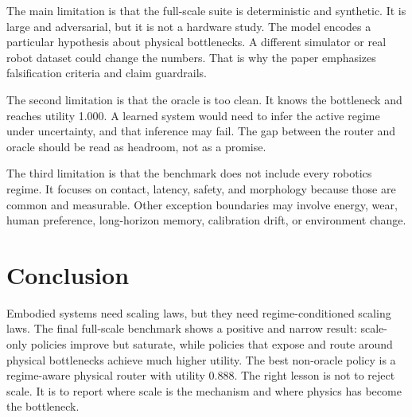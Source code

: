 \documentclass{article}
\begin{document}
The main limitation is that the full-scale suite is deterministic and synthetic. It is large and adversarial, but it is not a hardware study. The model encodes a particular hypothesis about physical bottlenecks. A different simulator or real robot dataset could change the numbers. That is why the paper emphasizes falsification criteria and claim guardrails.

The second limitation is that the oracle is too clean. It knows the bottleneck and reaches utility 1.000. A learned system would need to infer the active regime under uncertainty, and that inference may fail. The gap between the router and oracle should be read as headroom, not as a promise.

The third limitation is that the benchmark does not include every robotics regime. It focuses on contact, latency, safety, and morphology because those are common and measurable. Other exception boundaries may involve energy, wear, human preference, long-horizon memory, calibration drift, or environment change.

\section{Conclusion}

Embodied systems need scaling laws, but they need regime-conditioned scaling laws. The final full-scale benchmark shows a positive and narrow result: scale-only policies improve but saturate, while policies that expose and route around physical bottlenecks achieve much higher utility. The best non-oracle policy is a regime-aware physical router with utility 0.888. The right lesson is not to reject scale. It is to report where scale is the mechanism and where physics has become the bottleneck.

\clearpage
\appendix
\renewcommand{\thesection}{A.\arabic{section}}
\setcounter{section}{0}




\end{document}

